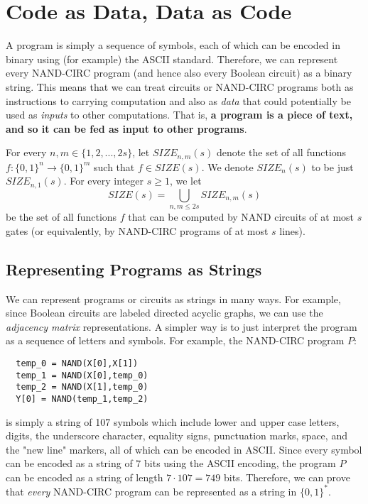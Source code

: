 \section{Code as Data, Data as Code}

  A program is simply a sequence of symbols, each of which can be encoded in binary using (for example) the ASCII standard. Therefore, we can represent every NAND-CIRC program (and hence also every Boolean circuit) as a binary string. This means that we can treat circuits or NAND-CIRC programs both as instructions to carrying computation and also as \textit{data} that could potentially be used as \textit{inputs} to other computations. That is, \textbf{a program is a piece of text, and so it can be fed as input to other programs}. 

  \begin{definition}
    For every $n, m \in \{1, 2, ..., 2s\}$, let $SIZE_{n, m} (s)$ denote the set of all functions $f: \{0,1\}^n \longrightarrow \{0,1\}^m$ such that $f \in SIZE(s)$. We denote $SIZE_n (s)$ to be just $SIZE_{n,1} (s)$. For every integer $s \geq 1$, we let 
    \[SIZE(s) = \bigcup_{n, m \leq 2s} SIZE_{n, m} (s)\]
    be the set of all functions $f$ that can be computed by NAND circuits of at most $s$ gates (or equivalently, by NAND-CIRC programs of at most $s$ lines). 
  \end{definition}

\subsection{Representing Programs as Strings}

  We can represent programs or circuits as strings in many ways. For example, since Boolean circuits are labeled directed acyclic graphs, we can use the \textit{adjacency matrix} representations. A simpler way is to just interpret the program as a sequence of letters and symbols. For example, the NAND-CIRC program $P$: 
  \begin{lstlisting}
  temp_0 = NAND(X[0],X[1])
  temp_1 = NAND(X[0],temp_0)
  temp_2 = NAND(X[1],temp_0)
  Y[0] = NAND(temp_1,temp_2)
  \end{lstlisting}
  is simply a string of 107 symbols which include lower and upper case letters, digits, the underscore character, equality signs, punctuation marks, space, and the "new line" markers, all of which can be encoded in ASCII. Since every symbol can be encoded as a string of $7$ bits using the ASCII encoding, the program $P$ can be encoded as a string of length $7 \cdot 107 = 749$ bits. Therefore, we can prove that \textit{every} NAND-CIRC program can be represented as a string in $\{0,1\}^*$. 

